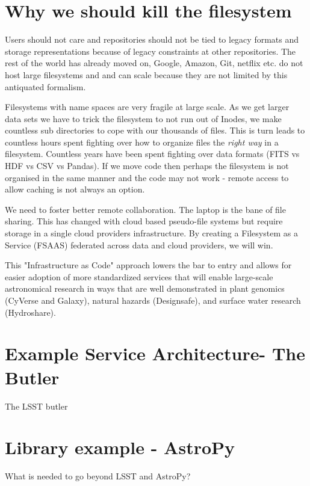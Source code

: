 \section{Why we should kill the filesystem}

Users should not care and repositories should not be tied to legacy formats  and storage representations because of legacy constraints  at other repositories.
The rest of the world has already moved on,  Google, Amazon, Git, netflix etc. do not host large filesystems and and can scale because they are not limited by this antiquated formalism.


Filesystems with name spaces are very fragile at large scale. As we get larger data sets we have to trick the filesystem to not run out of Inodes, we make countless sub directories to cope with our thousands of files.
This is turn leads to countless hours spent fighting over how to organize files  the \emph{right way} in a filesystem.
Countless years have been spent fighting over data formats (\gls{FITS} vs \gls{HDF} vs \gls{CSV} vs Pandas).
If we move code then perhaps the filesystem is not organised in the same manner and the code may not work - remote access to allow caching is not always an option.

We need to foster better remote collaboration.  The laptop is the bane of file sharing.
This has changed with cloud based pseudo-file systems but require storage in a single
cloud providers infrastructure. By creating a Filesystem as a Service (\gls{FSAAS}) federated
across data and cloud providers, we will win.


This "Infrastructure as Code" \citep{morris2016infrastructure} approach lowers the bar to entry
and allows for easier adoption of more standardized services that will enable large-scale
astronomical research in ways that are well demonstrated in plant genomics (CyVerse and Galaxy), natural hazards (Designsafe), and surface water research (Hydroshare).

\section{Example Service Architecture- The Butler}
The LSST butler

\section{Library example - AstroPy}
What is needed to go beyond \gls{LSST} and AstroPy?


